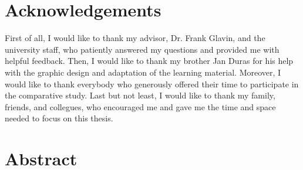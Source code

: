 

\setcounter{page}{1}

\rhead{}

\chapter*{Acknowledgements}

First of all, I would like to thank my advisor, Dr. Frank Glavin, and the university staff, who patiently answered my questions and provided me with helpful feedback.
Then, I would like to thank my brother Jan Duras for his help with the graphic design and adaptation of the learning material.
Moreover, I would like to thank everybody who generously offered their time to participate in the comparative study.
Last but not least, I would like to thank my family, friends, and collegues, who encouraged me and gave me the time and space needed to focus on this thesis.

\glsunsetall %

\tableofcontents

\listoftables

\listoffigures

\glsresetall %

\printglossary[type=\acronymtype, style=long, nonumberlist, title=List of Acronyms]

\chapter*{Abstract}

